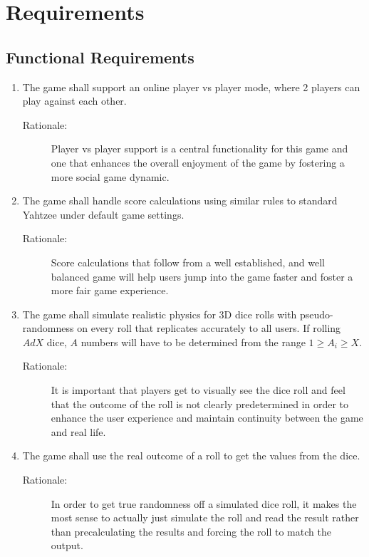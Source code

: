 \section{Requirements}

\subsection{Functional Requirements}

\begin{enumerate}[label=R\arabic*, start=1, left=0pt]

    \item \label{R1} The game shall support an online player vs player mode, where 2 players can play against each other.
    \begin{description}
        \item[Rationale:] Player vs player support is a central functionality for this game and one that enhances the overall enjoyment of the game by fostering a more social game dynamic.
    \end{description}

    \item \label{R2} The game shall handle score calculations using similar rules to standard Yahtzee under default game settings.
    \begin{description}
        \item[Rationale:] Score calculations that follow from a well established, and well balanced game will help users jump into the game faster and foster a more fair game experience.
    \end{description}

    \item \label{R3} The game shall simulate realistic physics for 3D dice rolls with pseudo-randomness on every roll that replicates accurately to all users. If rolling $AdX$ dice, $A$ numbers will have to be determined from the range $1 \geq A_{i} \geq X$.
    \begin{description}
        \item[Rationale:] It is important that players get to visually see the dice roll and feel that the outcome of the roll is not clearly predetermined in order to enhance the user experience and maintain continuity between the game and real life.
    \end{description}

    \item \label{R4} The game shall use the real outcome of a roll to get the values from the dice.
    \begin{description}
        \item[Rationale:] In order to get true randomness off a simulated dice roll, it makes the most sense to actually just simulate the roll and read the result rather than precalculating the results and forcing the roll to match the output.
    \end{description}


\end{enumerate}
